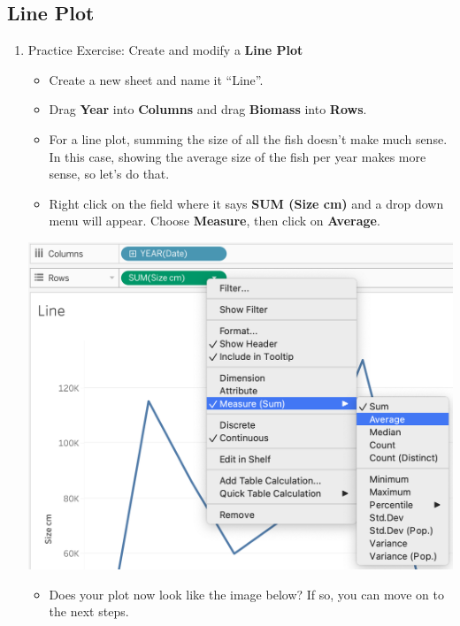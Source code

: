 \documentclass[
]{book}
\providecommand{\tightlist}{%
  \setlength{\itemsep}{0pt}\setlength{\parskip}{0pt}}
\begin{document}
\hypertarget{line-plot}{%
\subsection{Line Plot}\label{line-plot}}

\begin{enumerate}
\def\labelenumi{\arabic{enumi}.}
\item
  Practice Exercise: Create and modify a \textbf{Line Plot}

  \begin{itemize}
  \tightlist
  \item
    Create a new sheet and name it ``Line''.
  \item
    Drag \textbf{Year} into \textbf{Columns} and drag \textbf{Biomass} into \textbf{Rows}.
  \item
    For a line plot, summing the size of all the fish doesn't make much sense. In this case, showing the average size of the fish per year makes more sense, so let's do that.
  \item
    Right click on the field where it says \textbf{SUM (Size cm)} and a drop down menu will appear. Choose \textbf{Measure}, then click on \textbf{Average}.
  \end{itemize}

  \includegraphics{images/M3S2_change-measure.png}

  \begin{itemize}
  \tightlist
  \item
    Does your plot now look like the image below? If so, you can move on to the next steps.
  \end{itemize}
\end{enumerate}
\end{document}
